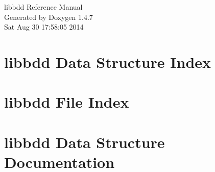 \documentclass[letterpaper]{book}
\begin{document}
\begin{titlepage}
\vspace*{7cm}
\begin{center}
{\Large libbdd Reference Manual}\\
\vspace*{1cm}
{\large Generated by Doxygen 1.4.7}\\
\vspace*{0.5cm}
{\small Sat Aug 30 17:58:05 2014}\\
\end{center}
\end{titlepage}
\clearemptydoublepage
{}
\tableofcontents
\clearemptydoublepage
{}
\chapter{libbdd Data Structure Index}

\chapter{libbdd File Index}

\chapter{libbdd Data Structure Documentation}






























\end{document}
